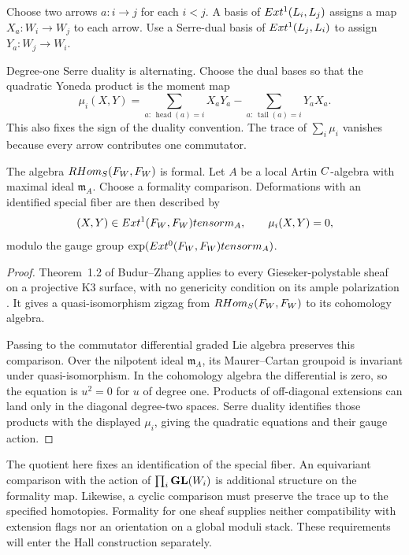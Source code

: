 Choose two arrows $a:i\to j$ for each $i<j$.  A basis of
$Ext^1(L_i,L_j)$ assigns a map $X_a:W_i\to W_j$ to each arrow.
Use a Serre-dual basis of $Ext^1(L_j,L_i)$ to assign
$Y_a:W_j\to W_i$.

Degree-one Serre duality is alternating.
Choose the dual bases so that the quadratic Yoneda product is the
moment map
\[
\mu_i(X,Y)=
\sum_{a:\,\operatorname{head}(a)=i}X_aY_a
-\sum_{a:\,\operatorname{tail}(a)=i}Y_aX_a.
\]
This also fixes the sign of the duality convention.  The trace of
$\sum_i\mu_i$ vanishes because every arrow contributes one commutator.

\begin{theorem}
\label{k3:thm:formality}
The algebra $RHom_S(F_W,F_W)$ is formal.  Let $A$ be a local
Artin $C$-algebra with maximal ideal $\mathfrak m_A$.  Choose a
formality comparison.  Deformations with an identified special
fiber are then described by
\[
(X,Y)\in Ext^1(F_W,F_W)tensorm_A,
\qquad \mu_i(X,Y)=0,
\]
modulo the gauge group
$\exp(Ext^0(F_W,F_W)tensorm_A)$.
\end{theorem}

\begin{proof}
Theorem~1.2 of Budur--Zhang applies to every Gieseker-polystable sheaf
on a projective K3 surface, with no genericity condition on its ample
polarization \cite{BudurZhangFormality}.  It gives a quasi-isomorphism
zigzag from $RHom_S(F_W,F_W)$ to its cohomology algebra.

Passing to the commutator differential graded Lie algebra preserves
this comparison.  Over the nilpotent ideal $\mathfrak m_A$, its
Maurer--Cartan groupoid is invariant under quasi-isomorphism.  In the
cohomology algebra the differential is zero, so the equation is
$u^2=0$ for $u$ of degree one.  Products of off-diagonal extensions
can land only in the diagonal degree-two spaces.  Serre duality
identifies those products with the displayed $\mu_i$, giving the
quadratic equations and their gauge action.
\end{proof}

The quotient here fixes an identification of the special fiber.
An equivariant comparison with the action of
$\prod_i\mathbf{GL}(W_i)$ is additional structure on the formality map.
Likewise, a cyclic comparison must preserve the trace up to the
specified homotopies.  Formality for one sheaf supplies neither
compatibility with extension flags nor an orientation on a global
moduli stack.  These requirements will enter the Hall construction
separately.

